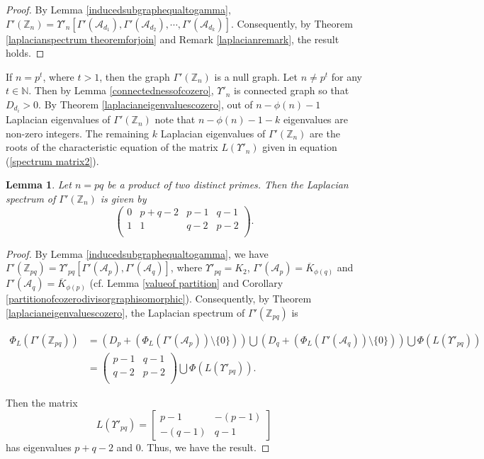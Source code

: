 \documentclass{amsart}
\theoremstyle{plain}
\newtheorem{lemma}[theorem]{Lemma}
\theoremstyle{definition}
\theoremstyle{remark}
\begin{document}
\begin{proof}
By Lemma \ref{inducedsubgraphequaltogamma}, $\Gamma'(\mathbb{Z}_n) = \Upsilon'_n [\Gamma'(\mathcal{A}_{d_1}), \Gamma'(\mathcal{A}_{d_2}), \cdots, \Gamma'(\mathcal{A}_{d_k})]$. Consequently, by Theorem \ref{laplacianspectrum theoremforjoin} and Remark \ref{laplacianremark}, the result holds.
\end{proof}
If $n = p^t$, where $t >1$, then the graph $\Gamma'(\mathbb{Z}_n)$ is a null graph. Let $n \neq p^t$ for any $t \in \mathbb{N}$. Then  by Lemma \ref{connectednessofcozero}, $\Upsilon'_n$ is connected graph so that $D_{d_i} > 0$. By Theorem \ref{laplacianeigenvaluescozero}, out of $n - \phi(n) -1$ Laplacian eigenvalues of $\Gamma'(\mathbb{Z}_n)$ note that $n - \phi(n) -1-k$ eigenvalues are non-zero integers. The remaining $k$ Laplacian eigenvalues of $\Gamma'(\mathbb{Z}_n)$ are the roots of the characteristic equation of the matrix $L(\Upsilon'_{n})$ given in equation (\ref{spectrum matrix2}).

\begin{lemma}
Let $n = pq$ be a product of two distinct primes. Then the Laplacian spectrum of $\Gamma'(\mathbb{Z}_n)$ is given by
\[\displaystyle \begin{pmatrix}
0 & p+q-2 &  p-1 & q-1 \\
 1 & 1 & q-2 & p-2 \\
\end{pmatrix}.\]
\end{lemma}

\begin{proof}
By Lemma \ref{inducedsubgraphequaltogamma}, we have $\Gamma'(\mathbb{Z}_{pq}) = \Upsilon'_{pq}[\Gamma'(\mathcal{A}_{p}), \Gamma'(\mathcal{A}_{q})]$, where $\Upsilon'_{pq} = K_2$, $\Gamma'(\mathcal{A}_{p}) = \overline{K}_{\phi(q)}$ and $\Gamma'(\mathcal{A}_{q}) = \overline{K}_{\phi(p)}$ (cf. Lemma \ref{valueof partition} and Corollary \ref{partitionofcozerodivisorgraphisomorphic}). Consequently, by Theorem \ref{laplacianeigenvaluescozero}, the Laplacian spectrum of $\Gamma'(\mathbb{Z}_{pq})$ is 

\begin{align*}
\Phi_{L}(\Gamma'(\mathbb{Z}_{pq})) &= (D_{p} + (\Phi_{L}(\Gamma'(\mathcal{A}_{p})) \setminus \{0\})) \bigcup (D_{q} + (\Phi_{L}(\Gamma'(\mathcal{A}_{q})) \setminus \{0\})) \bigcup \Phi(L(\Upsilon'_{pq}))\\
&= \displaystyle \begin{pmatrix}
 p-1 & q-1 \\
 q-2 & p-2 \\
\end{pmatrix} \bigcup \Phi(L(\Upsilon'_{pq})).
\end{align*}


Then the matrix \[L(\Upsilon'_{pq})  = \displaystyle \begin{bmatrix}
	p-1 &  -(p-1) \\
	-(q-1)& q-1   
\end{bmatrix}\]
 has eigenvalues $p+q-2$ and $0$. Thus, we have the result. %
\end{proof}
\end{document}
